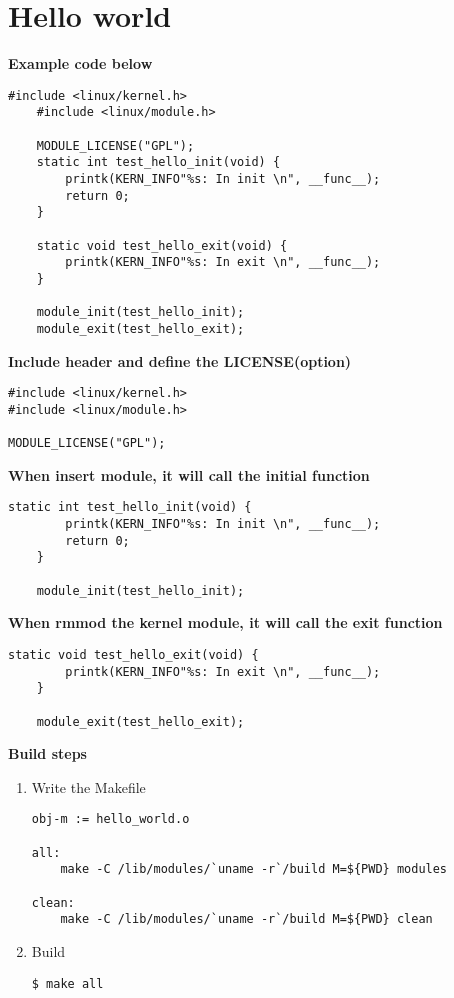 \section{Hello world}

\textbf{Example code below}
\begin{lstlisting}[style=CStyle]
    #include <linux/kernel.h>
    #include <linux/module.h>
    
    MODULE_LICENSE("GPL");
    static int test_hello_init(void) {
        printk(KERN_INFO"%s: In init \n", __func__);
        return 0;
    }
    
    static void test_hello_exit(void) {
        printk(KERN_INFO"%s: In exit \n", __func__);
    }
    
    module_init(test_hello_init);
    module_exit(test_hello_exit);    
\end{lstlisting}

\textbf{Include header and define the LICENSE(option)}
\begin{lstlisting}[style=CStyle]
#include <linux/kernel.h>
#include <linux/module.h>

MODULE_LICENSE("GPL");
\end{lstlisting}

\textbf{When insert module, it will call the initial function}
\begin{lstlisting}[style=CStyle]
    static int test_hello_init(void) {
        printk(KERN_INFO"%s: In init \n", __func__);
        return 0;
    }

    module_init(test_hello_init);
\end{lstlisting}

\textbf{When rmmod the kernel module, it will call the exit function}
\begin{lstlisting}[style=CStyle]
    static void test_hello_exit(void) {
        printk(KERN_INFO"%s: In exit \n", __func__);
    }

    module_exit(test_hello_exit);
\end{lstlisting}


\textbf{Build steps}
\begin{enumerate}
    \item Write the Makefile
\begin{lstlisting}[style=bashStyle]
obj-m := hello_world.o

all:
    make -C /lib/modules/`uname -r`/build M=${PWD} modules

clean:
    make -C /lib/modules/`uname -r`/build M=${PWD} clean
\end{lstlisting}
    \item Build
\begin{lstlisting}[style=bashStyle]
    $ make all
\end{lstlisting}
\end{enumerate}


